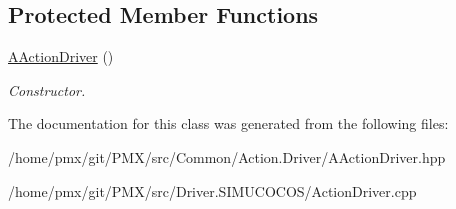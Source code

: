 \subsection*{Protected Member Functions}
\begin{DoxyCompactItemize}
\item 
\mbox{\label{classAActionDriver_af2fcbea774b20428f4824b4cf06092bb}} 
\hyperlink{classAActionDriver_af2fcbea774b20428f4824b4cf06092bb}{A\+Action\+Driver} ()
\begin{DoxyCompactList}\small\item\em Constructor. \end{DoxyCompactList}\end{DoxyCompactItemize}


The documentation for this class was generated from the following files\+:\begin{DoxyCompactItemize}
\item 
/home/pmx/git/\+P\+M\+X/src/\+Common/\+Action.\+Driver/A\+Action\+Driver.\+hpp\item 
/home/pmx/git/\+P\+M\+X/src/\+Driver.\+S\+I\+M\+U\+C\+O\+C\+O\+S/Action\+Driver.\+cpp\end{DoxyCompactItemize}
